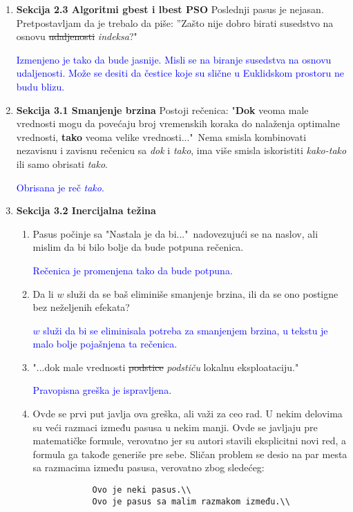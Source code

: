 \documentclass[a4paper]{report}
\newcommand{\odgovor}[1]{\textcolor{blue}{#1}}
\begin{document}
\begin{enumerate}
\begin{enumerate}
    \end{enumerate}
    
    \item \textbf{Sekcija 2.3 Algoritmi gbest i lbest PSO} Poslednji pasus je nejasan. Pretpostavljam da je trebalo da piše: ''Zašto nije dobro birati susedstvo na osnovu \st{udaljenosti} \textit{indeksa}?"

    \odgovor{Izmenjeno je tako da bude jasnije. Misli se na biranje susedstva na osnovu udaljenosti. Može se desiti da čestice koje su slične u Euklidskom prostoru ne budu blizu.}
    
    \item \textbf{Sekcija 3.1 Smanjenje brzina} Postoji rečenica: "\textbf{Dok} veoma male vrednosti mogu da povećaju broj vremenskih koraka do nalaženja optimalne vrednosti, \textbf{tako} veoma velike vrednosti..."\ Nema smisla kombinovati nezavisnu i zavisnu rečenicu sa \textit{dok} i \textit{tako}, ima više smisla iskoristiti \textit{kako-tako} ili samo obrisati \textit{tako}.
    
    \odgovor{Obrisana je reč \textit{tako}. }
    
    \item \textbf{Sekcija 3.2 Inercijalna težina}
    \begin{enumerate}
        \item Pasus počinje sa "Nastala je da bi..."\ nadovezujući se na naslov, ali mislim da bi bilo bolje da bude potpuna rečenica.
        
        \odgovor{Rečenica je promenjena tako da bude potpuna.}
        
        \item Da li $w$ služi da se baš eliminiše smanjenje brzina, ili da se ono postigne bez neželjenih efekata?
        
        \odgovor{$w$ služi da bi se eliminisala potreba za smanjenjem brzina, u tekstu je malo bolje pojašnjena ta rečenica.}
        
        \item "...dok male vrednosti \st{podstice} \textit{podstiču} lokalnu eksploataciju."
        
        \odgovor{Pravopisna greška je ispravljena.}
        
        \item Ovde se prvi put javlja ova greška, ali važi za ceo rad. U nekim delovima su veći razmaci između pasusa u nekim manji. Ovde se javljaju pre matematičke formule, verovatno jer su autori stavili eksplicitni novi red, a formula ga takođe generiše pre sebe. Sličan problem se desio na par mesta sa razmacima između pasusa, verovatno zbog sledećeg:
        \begin{verbatim}
            Ovo je neki pasus.\\
            Ovo je pasus sa malim razmakom između.\\
            

\end{verbatim}
\end{enumerate}
\end{enumerate}
\end{document}
